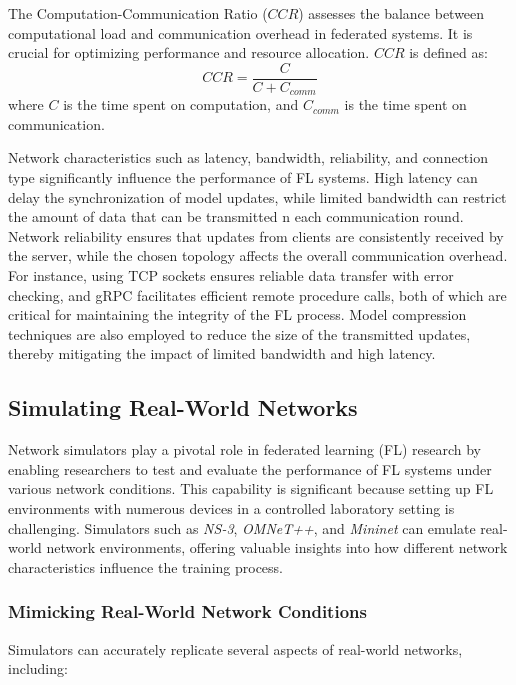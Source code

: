 The Computation-Communication Ratio (\(CCR\)) assesses the balance between computational load and communication overhead in federated systems.
It is crucial for optimizing performance and resource allocation. \( CCR \) is defined as:
\[
    CCR = \frac{C}{C + C_{comm}}
\]
where \( C \) is the time spent on computation, and \( C_{comm} \) is the time spent on communication.

Network characteristics such as latency, bandwidth, reliability, and connection type significantly influence the performance of FL systems.
High latency can delay the synchronization of model updates, while limited bandwidth can restrict the amount of data that can be transmitted
n each communication round. Network reliability ensures that updates from clients are consistently received by the server, while the chosen
topology affects the overall communication overhead. For instance, using TCP sockets ensures reliable data transfer with error checking, and
gRPC facilitates efficient remote procedure calls, both of which are critical for maintaining the integrity of the FL process. Model compression
techniques are also employed to reduce the size of the transmitted updates, thereby mitigating the impact of limited bandwidth and high latency.

\subsection{Simulating Real-World Networks}
Network simulators play a pivotal role in federated learning (FL) research by enabling researchers to test and evaluate the performance of FL systems under various network conditions. This capability is significant because setting up FL environments with numerous devices in a controlled laboratory setting is challenging. Simulators such as \textit{NS-3}, \textit{OMNeT++}, and \textit{Mininet} can emulate real-world network environments, offering valuable insights into how different network characteristics influence the training process.

\subsubsection{Mimicking Real-World Network Conditions}

Simulators can accurately replicate several aspects of real-world networks, including:

